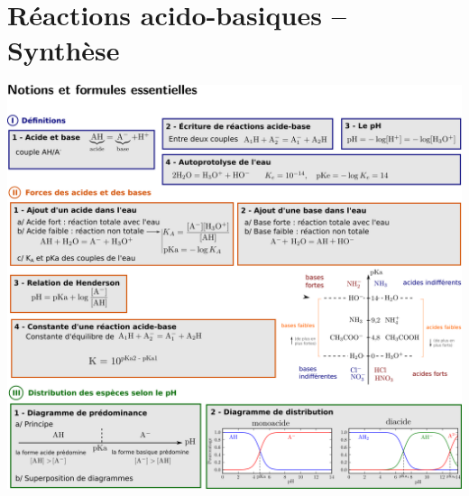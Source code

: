 \documentclass[../../main/main.tex]{subfiles}
\begin{document}
\setcounter{chapter}{3}


\chapter{R\'eactions acido-basiques -- Synth\`ese}

\begin{center}
	\includegraphics[scale=1]{fiche}
\end{center}
\end{document}

